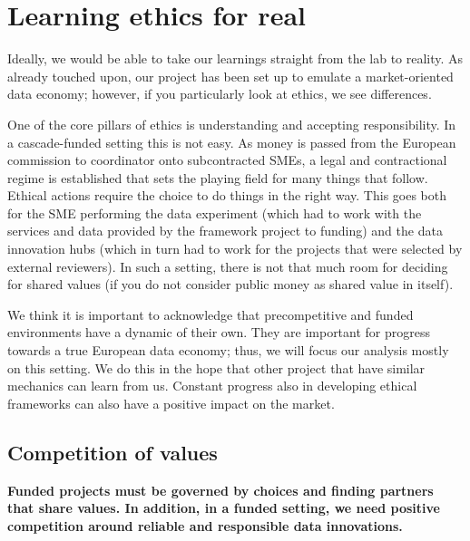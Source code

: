 
\section{Learning ethics for real}\label{learning-ethics-for-real}

Ideally, we would be able to take our learnings straight from the lab to
reality. As already touched upon, our project has been set up to emulate
a market-oriented data economy; however, if you particularly look at
ethics, we see  differences.

One of the core pillars of ethics is understanding and accepting
responsibility. In a cascade-funded setting this is not easy. As money
is passed from the European commission to coordinator onto subcontracted
SMEs, a legal and contractional regime is established that sets the
playing field for many things that follow. Ethical actions require the
choice to do things in the right way. This goes both for the SME
performing the data experiment (which had to work with the services and
data provided by the framework project to funding) and the data
innovation hubs (which in turn had to work for the projects that were
selected by external reviewers). In such a setting, there is not that
much room for deciding for shared values (if you do not consider public
money as shared value in itself).

We think it is important to acknowledge that precompetitive and funded
environments have a dynamic of their own. They are important for
progress towards a true European data economy; thus, we will focus our
analysis mostly on this setting. We do this in the hope that other
project that have similar mechanics can learn from us. Constant progress
also in developing ethical frameworks can also have a positive impact on
the market.

\subsection{Competition of values}\label{competition-of-values}

\textbf{Funded projects must be governed by choices and finding partners
that share values. In addition, in a funded setting, we need positive
competition around reliable and responsible data innovations.}


